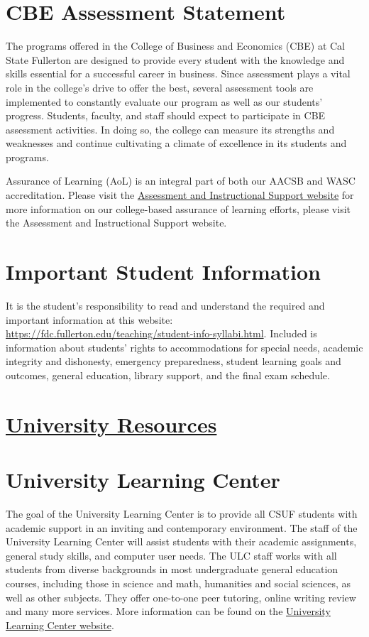 \documentclass{syllabus}
\begin{document}
{\section*{CBE Assessment Statement}
The programs offered in the College of Business and Economics (CBE) at Cal State Fullerton are designed to provide every student with the knowledge and skills essential for a successful career in business. Since assessment plays a vital role in the college's drive to offer the best, several assessment tools are implemented to constantly evaluate our program as well as our students' progress. Students, faculty, and staff should expect to participate in CBE assessment activities. In doing so, the college can measure its strengths and weaknesses and continue cultivating a climate of excellence in its students and programs.

Assurance of Learning (AoL) is an integral part of both our AACSB and WASC accreditation. Please visit the \href{https://business.fullerton.edu/assessment}{Assessment and Instructional Support website} for more information on our college-based assurance of learning efforts, please visit the Assessment and Instructional Support website.

\section*{Important Student Information}
It is the student's responsibility to read and understand the required and important information at this website: \href{https://fdc.fullerton.edu/teaching/student-info-syllabi.html}{https://fdc.fullerton.edu/teaching/student-info-syllabi.html}. Included is information about students' rights to accommodations for special needs, academic integrity and dishonesty, emergency preparedness, student learning goals and outcomes, general education, library support, and the final exam schedule.

\section*{\centering \underline{University Resources}} \vspace{1em}
\section*{University Learning Center}
The goal of the University Learning Center is to provide all CSUF students with academic support in an inviting and contemporary environment. The staff of the University Learning Center will assist students with their academic assignments, general study skills, and computer user needs. The ULC staff works with all students from diverse backgrounds in most undergraduate general education courses, including those in science and math, humanities and social sciences, as well as other subjects. They offer one-to-one peer tutoring, online writing review and many more services. More information can be found on the \href{https://www.fullerton.edu/ulc/}{University Learning Center website}.

}
\end{document}
